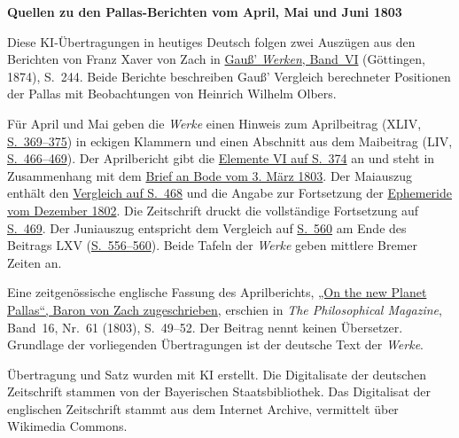 \clearpage\thispagestyle{empty}
\begin{center}\textbf{Quellen zu den Pallas-Berichten vom April, Mai und Juni 1803}\end{center}
\noindent Diese KI-Übertragungen in heutiges Deutsch folgen zwei Auszügen aus den Berichten von Franz Xaver von Zach in \href{https://gdz.sub.uni-goettingen.de/id/PPN236007467}{Gauß’ \textit{Werken}, Band~VI} (Göttingen, 1874), S.~244. Beide Berichte beschreiben Gauß’ Vergleich berechneter Positionen der Pallas mit Beobachtungen von Heinrich Wilhelm Olbers.
\par\smallskip\noindent Für April und Mai geben die \textit{Werke} einen Hinweis zum Aprilbeitrag (XLIV, \href{https://api.digitale-sammlungen.de/iiif/image/v2/bsb10538599_00387/full/1450,/0/default.jpg}{S.~369--375}) in eckigen Klammern und einen Abschnitt aus dem Maibeitrag (LIV, \href{https://api.digitale-sammlungen.de/iiif/image/v2/bsb10538599_00486/full/1450,/0/default.jpg}{S.~466--469}). Der Aprilbericht gibt die \href{https://api.digitale-sammlungen.de/iiif/image/v2/bsb10538599_00392/full/1450,/0/default.jpg}{Elemente VI auf S.~374} an und steht in Zusammenhang mit dem \href{https://api.digitale-sammlungen.de/iiif/image/v2/bsb10538335_00189/full/1450,/0/default.jpg}{Brief an Bode vom 3. März 1803}. Der Maiauszug enthält den \href{https://api.digitale-sammlungen.de/iiif/image/v2/bsb10538599_00488/full/1450,/0/default.jpg}{Vergleich auf S.~468} und die Angabe zur Fortsetzung der \href{https://api.digitale-sammlungen.de/iiif/image/v2/bsb10538598_00597/full/1450,/0/default.jpg}{Ephemeride vom Dezember 1802}. Die Zeitschrift druckt die vollständige Fortsetzung auf \href{https://api.digitale-sammlungen.de/iiif/image/v2/bsb10538599_00489/full/1450,/0/default.jpg}{S.~469}. Der Juniauszug entspricht dem Vergleich auf \href{https://api.digitale-sammlungen.de/iiif/image/v2/bsb10538599_00584/full/1450,/0/default.jpg}{S.~560} am Ende des Beitrags LXV (\href{https://api.digitale-sammlungen.de/iiif/image/v2/bsb10538599_00580/full/1450,/0/default.jpg}{S.~556--560}). Beide Tafeln der \textit{Werke} geben mittlere Bremer Zeiten an.
\par\smallskip\noindent Eine zeitgenössische englische Fassung des Aprilberichts, \href{https://upload.wikimedia.org/wikipedia/commons/d/d6/The_philosophical_magazine._Volume_16%2C_1803._%28IA_s2id13415870%29.pdf#page=53}{„On the new Planet Pallas“, Baron von Zach zugeschrieben}, erschien in \textit{The Philosophical Magazine}, Band~16, Nr.~61 (1803), S.~49--52. Der Beitrag nennt keinen Übersetzer. Grundlage der vorliegenden Übertragungen ist der deutsche Text der \textit{Werke}.
\par\smallskip\noindent Übertragung und Satz wurden mit KI erstellt. Die Digitalisate der deutschen Zeitschrift stammen von der Bayerischen Staatsbibliothek. Das Digitalisat der englischen Zeitschrift stammt aus dem Internet Archive, vermittelt über Wikimedia Commons.
\clearpage
